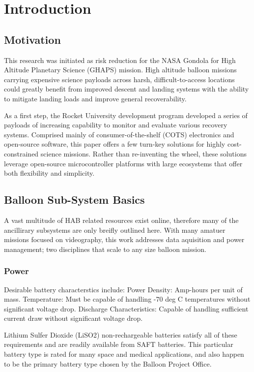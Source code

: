 \documentclass[heading.tex]{subfiles}
\begin{document}

\section{Introduction}
\subsection{Motivation}
This research was initiated as risk reduction for the NASA
Gondola for High Altitude Planetary Science (GHAPS) mission.
High altitude balloon missions carrying expensive science payloads
across harsh, difficult-to-access locations could greatly benefit from
improved descent and landing systems with the ability to mitigate landing
loads and improve general recoverability.

As a first step, the Rocket University development program developed a series
of payloads of increasing capability to monitor and evaluate various recovery
systems. Comprised mainly of consumer-of-the-shelf (COTS) electronics and
open-source software, this paper offers a few turn-key solutions for highly
cost-constrained science missions. Rather than re-inventing the wheel, these
solutions leverage open-source microcontroller platforms with large ecosystems
that offer both flexibility and simplicity.


\subsection{Balloon Sub-System Basics}

A vast multitude of HAB related resources exist online, therefore many of the
ancillirary subsystems are only breifly outlined here. With many amatuer missions
focused on videography, this work addresses data aquisition and power management;
two disciplines that scale to any size balloon mission.

\subsubsection{Power}

Desirable battery characterstics include:
Power Density: Amp-hours per unit of mass.
Temperature: Must be capable of handling -70 deg C temperatures without
significant voltage drop.
Discharge Characteristics: Capable of handling sufficient current draw without
significant voltage drop.

Lithium Sulfer Dioxide (LiSO2) non-rechargeable batteries satisfy all of these
requirements and are readily available from SAFT batteries.
This particular battery type is rated for many space and medical applications,
and also happen to be the primary battery type chosen by the Balloon Project Office.
\end{document}
